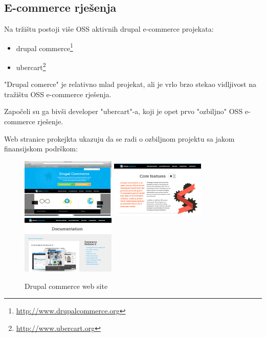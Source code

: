 \documentclass[times, utf8, seminar]{fit}
\begin{document}
{%

\subsection{E-commerce rješenja}

Na tržištu postoji više OSS aktivnih drupal e-commerce projekata:

\begin{itemize}
\ubercart  
\item drupal commerce\footnote{\url{http://www.drupalcommerce.org}} 
\item ubercart\footnote{\url{http://www.ubercart.org}}
\end{itemize}

"Drupal comerce" je relativno mlad projekat, ali je vrlo brzo stekao vidljivost na tražištu OSS e-commerce rješenja.

Započeli su ga bivši developer "ubercart"-a, koji je opet prvo "ozbiljno" OSS e-commerce rješenje.

Web stranice prokejkta ukazuju da se radi o ozbiljnom projektu sa jakom finansijskom podrškom:

\begin{figure}[H]
\centering
\includegraphics[width=4.5cm]{img/drupalcommerce_web.png}\hfill
\includegraphics[width=4.5cm]{img/drupalcommerce_web_2.png}\hfill
\includegraphics[width=4.5cm]{img/drupalcommerce_web_3.png} 
\caption{Drupal commerce web site}
\end{figure}

}
\end{document}
